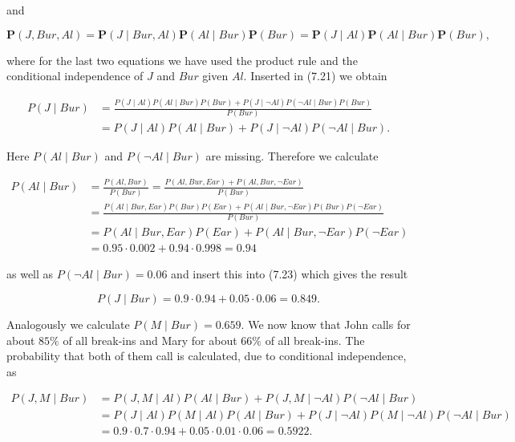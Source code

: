 \documentclass[10pt]{book}
\begin{document}
and

\begin{equation*}
\boldsymbol{P}(J, Bur, Al)=\boldsymbol{P}(J \mid Bur, Al) \boldsymbol{P}(Al \mid Bur) \boldsymbol{P}(Bur)=\boldsymbol{P}(J \mid Al) \boldsymbol{P}(Al \mid Bur) \boldsymbol{P}(Bur), \tag{7.22}
\end{equation*}

where for the last two equations we have used the product rule and the conditional independence of $J$ and $Bur$ given $Al$. Inserted in (7.21) we obtain

\begin{align*}
P(J \mid Bur) & =\frac{P(J \mid Al) P(Al \mid Bur) P(Bur)+P(J \mid \neg Al) P(\neg Al \mid Bur) P(Bur)}{P(Bur)}  \tag{7.23}\\
& =P(J \mid Al) P(Al \mid Bur)+P(J \mid \neg Al) P(\neg Al \mid Bur) .
\end{align*}

Here $P(Al \mid Bur)$ and $P(\neg Al \mid Bur)$ are missing. Therefore we calculate

$$
\begin{aligned}
P(Al \mid Bur) & =\frac{P(Al, Bur)}{P(Bur)}=\frac{P(Al, Bur, Ear)+P(Al, Bur, \neg Ear)}{P(Bur)} \\
& =\frac{P(Al \mid Bur, Ear) P(Bur) P(Ear)+P(Al \mid Bur, \neg Ear) P(Bur) P(\neg Ear)}{P(Bur)} \\
& =P(Al \mid Bur, Ear) P(Ear)+P(Al \mid Bur, \neg Ear) P(\neg Ear) \\
& =0.95 \cdot 0.002+0.94 \cdot 0.998=0.94
\end{aligned}
$$

as well as $P(\neg Al \mid Bur)=0.06$ and insert this into (7.23) which gives the result

$$
P(J \mid Bur)=0.9 \cdot 0.94+0.05 \cdot 0.06=0.849 .
$$

Analogously we calculate $P(M \mid Bur)=0.659$. We now know that John calls for about $85 \%$ of all break-ins and Mary for about $66 \%$ of all break-ins. The probability that both of them call is calculated, due to conditional independence, as

$$
\begin{aligned}
P(J, M \mid Bur) & =P(J, M \mid Al) P(Al \mid Bur)+P(J, M \mid \neg Al) P(\neg Al \mid Bur) \\
& =P(J \mid Al) P(M \mid Al) P(Al \mid Bur)+P(J \mid \neg Al) P(M \mid \neg Al) P(\neg Al \mid Bur) \\
& =0.9 \cdot 0.7 \cdot 0.94+0.05 \cdot 0.01 \cdot 0.06=0.5922 .
\end{aligned}
$$
\end{document}

